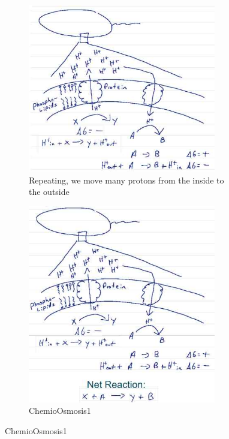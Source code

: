 \documentclass[]{article}
\begin{document}
\begin{figure}[H]
\begin{subfigure}[t]{0.45\textwidth}
	\end{subfigure}
	\begin{subfigure}[t]{0.45\textwidth}
		\caption{Repeating, we move many protons from the inside to the outside}\label{fig:ChemioOsmosis2}
		\includegraphics[width=0.9\textwidth]{ChemioOsmosis2}
	\end{subfigure}
	\begin{subfigure}[t]{0.45\textwidth}
		\caption{ChemioOsmosis1}\label{fig:ChemioOsmosis3}
		\includegraphics[width=0.9\textwidth]{ChemioOsmosis3}
	\end{subfigure}
\end{figure}
\end{document}
